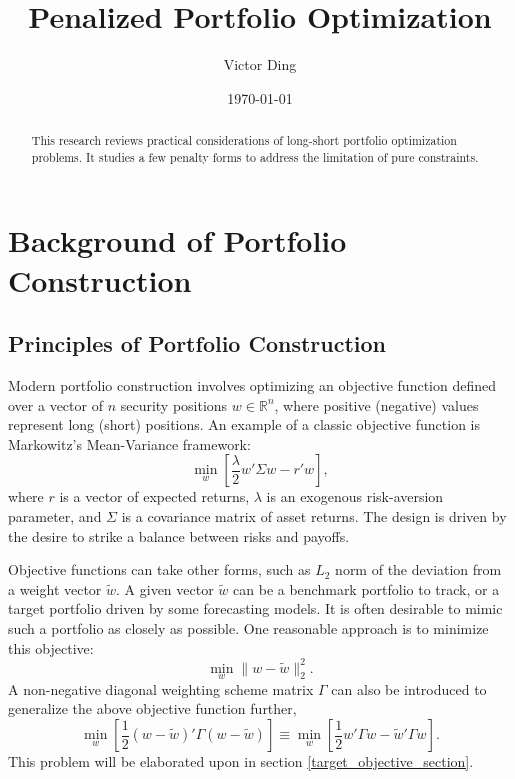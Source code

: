 \documentclass[11pt, letterpaper]{article}
\title{Penalized Portfolio Optimization}
\author{Victor Ding}
\affil{New Canaan High School}
\date{\today}
\begin{document}
\maketitle

\newpage
\setcounter{page}{1} %
\pagestyle{plain}

\begin{abstract}
\noindent
This research reviews practical considerations of long-short portfolio optimization problems. It studies a few penalty forms to
address the limitation of pure constraints.
\end{abstract}
\newpage
\section{Background of Portfolio Construction}

\subsection{Principles of Portfolio Construction}

Modern portfolio construction involves optimizing an objective function defined over a vector of $n$ security positions
$w \in \mathds{R}^n$, where positive (negative) values represent long (short) positions. An example of a classic objective
function is Markowitz's Mean-Variance framework:
\begin{equation}
    \label{mean-variance_objective}
    \underset{w}{\min} \left[\frac{\lambda}{2} w' \Sigma w - r' w\right],
\end{equation}
where $r$ is a vector of expected returns, $\lambda$ is an exogenous risk-aversion parameter, and $\Sigma$ is a covariance
matrix of asset returns. The design is driven by the desire to strike a balance between risks and payoffs.

Objective functions can take other forms, such as $L_2$ norm of the deviation from a weight vector $\tilde{w}$. A given vector
$\tilde{w}$ can be a benchmark portfolio to track, or a target portfolio driven by some forecasting models. It is often
desirable to mimic such a portfolio as closely as possible. One reasonable approach is to minimize this objective:
\begin{equation*}
	\underset{w}{\min} \lVert w - \tilde{w}\rVert_2^2.
\end{equation*}
A non-negative diagonal weighting scheme matrix $\Gamma$ can also be introduced to generalize the above objective function further,
\begin{equation*}
	\underset{w}{\min}\left[\frac{1}{2} (w - \tilde{w})'\Gamma(w - \tilde{w})\right] \equiv
  \underset{w}{\min}\left[\frac{1}{2} w'\Gamma w - \tilde{w}'\Gamma w \right].
\end{equation*}
This problem will be elaborated upon in section \ref{target_objective_section}.
\end{document}
